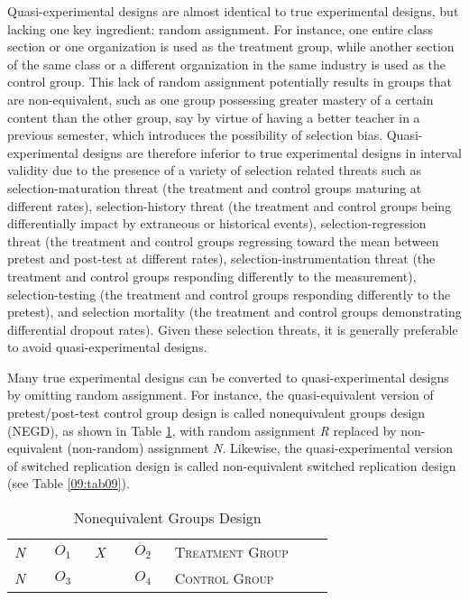 Quasi-experimental designs are almost identical to true experimental designs, but lacking one key ingredient: random assignment. For instance, one entire class section or one organization is used as the treatment group, while another section of the same class or a different organization in the same industry is used as the control group. This lack of random assignment potentially results in groups that are non-equivalent, such as one group possessing greater mastery of a certain content than the other group, say by virtue of having a better teacher in a previous semester, which introduces the possibility of selection bias. Quasi-experimental designs are therefore inferior to true experimental designs in interval validity due to the presence of a variety of selection related threats such as selection-maturation threat (the treatment and control groups maturing at different rates), selection-history threat (the treatment and control groups being differentially impact by extraneous or historical events), selection-regression threat (the treatment and control groups regressing toward the mean between pretest and post-test at different rates), selection-instrumentation threat (the treatment and control groups responding differently to the measurement), selection-testing (the treatment and control groups responding differently to the pretest), and selection mortality (the treatment and control groups demonstrating differential dropout rates). Given these selection threats, it is generally preferable to avoid quasi-experimental designs.

Many true experimental designs can be converted to quasi-experimental designs by omitting random assignment. For instance, the quasi-equivalent version of pretest/post-test control group design is called nonequivalent groups design (NEGD), as shown in Table \ref{09:tab08}, with random assignment \textit{R} replaced by non-equivalent (non-random) assignment \textit{N}. Likewise, the quasi-experimental version of switched replication design is called non-equivalent switched replication design (see Table \ref{09:tab09}).

\begin{table}[H]
	\centering
	\begin{tabularx}{0.85\linewidth}{p{0.10\linewidth}p{0.10\linewidth}p{0.10\linewidth}p{0.10\linewidth}p{0.40\linewidth}}
		\toprule
		\textit{N} & $ O_1 $ & \textit{X} & $ O_2 $ & \textsc{Treatment Group} \\
		\textit{N} & $ O_3 $ &            & $ O_4 $ & \textsc{Control Group} \\
		\bottomrule
	\end{tabularx}
	\caption{Nonequivalent Groups Design}
	\label{09:tab08}
\end{table}



